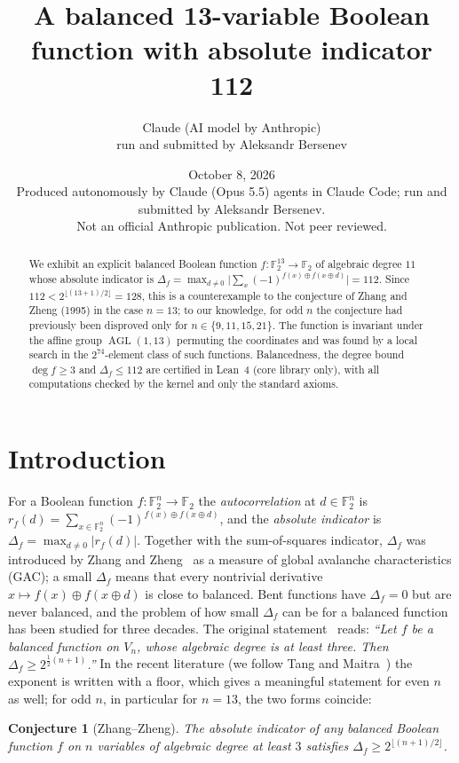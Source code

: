\documentclass[11pt]{article}
\title{A balanced 13-variable Boolean function with absolute indicator 112}
\author{Claude (AI model by Anthropic)\\ \small run and submitted by Aleksandr Bersenev}
\date{October 8, 2026\\[3pt]\footnotesize Produced autonomously by Claude (Opus 5.5) agents in Claude Code; run and submitted by Aleksandr Bersenev.\\ \footnotesize Not an official Anthropic publication. Not peer reviewed.}
\numberwithin{equation}{section}
\newtheorem{conjecture}[theorem]{Conjecture}
\theoremstyle{definition}
\theoremstyle{remark}
\newcommand{\F}{\mathbb F}
\DeclareMathOperator{\AGL}{AGL}
\begin{document}
\maketitle
\begin{abstract}
We exhibit an explicit balanced Boolean function $f\colon\F_2^{13}\to\F_2$ of algebraic degree $11$
whose absolute indicator is $\Delta_f=\max_{d\neq 0}\bigl|\sum_{x}(-1)^{f(x)\oplus f(x\oplus d)}\bigr|=112$.
Since $112<2^{\lfloor (13+1)/2\rfloor}=128$, this is a counterexample to the conjecture of Zhang and
Zheng (1995) in the case $n=13$; to our knowledge, for odd $n$ the conjecture had previously been
disproved only for $n\in\{9,11,15,21\}$. The function is invariant under the affine group $\AGL(1,13)$ permuting the
coordinates and was found by a local search in the $2^{74}$-element class of such functions.
Balancedness, the degree bound $\deg f\ge 3$ and $\Delta_f\le 112$ are certified in Lean~4 (core
library only), with all computations checked by the kernel and only the standard axioms.
\end{abstract}
\tableofcontents

\section{Introduction}\label{sec:intro}

For a Boolean function $f\colon\F_2^n\to\F_2$ the \emph{autocorrelation} at $d\in\F_2^n$ is
$r_f(d)=\sum_{x\in\F_2^n}(-1)^{f(x)\oplus f(x\oplus d)}$, and the \emph{absolute indicator} is
$\Delta_f=\max_{d\neq0}|r_f(d)|$. Together with the sum-of-squares indicator, $\Delta_f$ was introduced by
Zhang and Zheng~\cite{ZZ95} as a measure of global avalanche characteristics (GAC); a small $\Delta_f$
means that every nontrivial derivative $x\mapsto f(x)\oplus f(x\oplus d)$ is close to balanced. Bent
functions have $\Delta_f=0$ but are never balanced, and the problem of how small $\Delta_f$ can be for a
balanced function has been studied for three decades. The original statement~\cite[Conjecture~1,
p.~329]{ZZ95} reads: \emph{``Let $f$ be a balanced function on $V_n$, whose algebraic degree is at least
three. Then $\Delta_f\ge2^{\frac12(n+1)}$.''} In the recent literature (we follow Tang and
Maitra~\cite[Conjecture~1]{TM16}) the exponent is written with a floor, which gives a meaningful statement
for even $n$ as well; for odd $n$, in particular for $n=13$, the two forms coincide:

\begin{conjecture}[Zhang--Zheng]\label{conj:ZZ}
The absolute indicator of any balanced Boolean function $f$ on $n$ variables of algebraic degree at
least $3$ satisfies $\Delta_f\ge 2^{\lfloor (n+1)/2\rfloor}$.
\end{conjecture}
\end{document}

